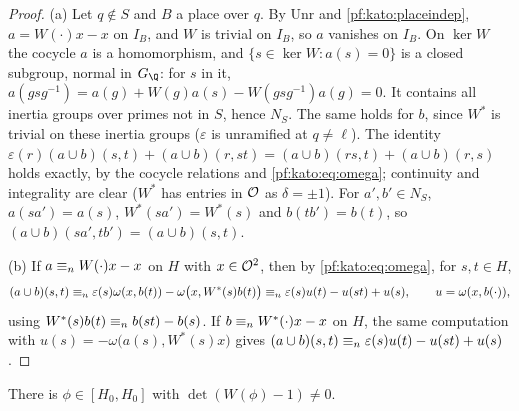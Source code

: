 \begin{proof}
(a) Let $q\notin S$ and $B$ a place over $q$. By $\mathrm{Unr}$ and \cref{pf:kato:placeindep}, $a=W(\cdot)x-x$ on $I_B$, and $W$
is trivial on $I_B$, so $a$ vanishes on $I_B$. On $\ker W$ the cocycle $a$ is a homomorphism, and
$\{s\in\ker W:a(s)=0\}$ is a closed subgroup, normal in $G_\Q$: for $s$ in it,
$a(gsg^{-1})=a(g)+W(g)a(s)-W(gsg^{-1})a(g)=0$. It contains all inertia groups over primes not in $S$, hence $N_S$. The
same holds for $b$, since $W^*$ is trivial on these inertia groups ($\varepsilon$ is unramified at $q\ne\ell$). The identity
$\varepsilon(r)(a\cup b)(s,t)+(a\cup b)(r,st)=(a\cup b)(rs,t)+(a\cup b)(r,s)$ holds exactly, by the cocycle relations and
\eqref{pf:kato:eq:omega}; continuity and integrality are clear ($W^*$ has entries in $\mathcal{O}$ as $\delta=\pm1$). For $a',b'\in
N_S$, $a(sa')=a(s)$, $W^*(sa')=W^*(s)$ and $b(tb')=b(t)$, so $(a\cup b)(sa',tb')=(a\cup b)(s,t)$.

(b) If $a\equiv_{n}W(\cdot)x-x$ on $H$ with $x\in\mathcal{O}^2$, then by \eqref{pf:kato:eq:omega}, for $s,t\in H$,
\[
(a\cup b)(s,t)\equiv_{n}\varepsilon(s)\omega(x,b(t))-\omega\bigl(x,W^*(s)b(t)\bigr)\equiv_{n}\varepsilon(s)u(t)-u(st)+u(s),\qquad
u=\omega(x,b(\cdot)),
\]
using $W^*(s)b(t)\equiv_{n}b(st)-b(s)$. If $b\equiv_{n}W^*(\cdot)x-x$ on $H$, the same computation with
$u(s)=-\omega\bigl(a(s),W^*(s)x\bigr)$ gives $(a\cup b)(s,t)\equiv_{n}\varepsilon(s)u(t)-u(st)+u(s)$.
\end{proof}

\begin{lemma}\label{pf:kato:commdet}
There is $\phi\in[H_0,H_0]$ with $\det(W(\phi)-1)\ne0$.
\end{lemma}

